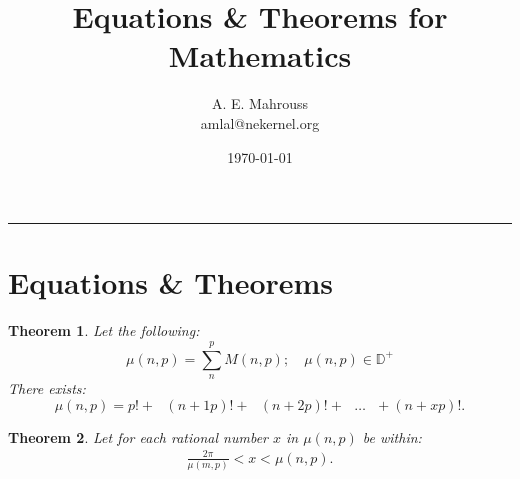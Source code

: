 \documentclass[10pt]{article}
\title{%
  \vspace{-1.5em}%
  \large\textbf{Equations \& Theorems for Mathematics}%
}
\author{A. E. Mahrouss\\amlal@nekernel.org}
\date{\today}
\theoremstyle{plain}
\newtheorem{theorem}{Theorem}[section]
\theoremstyle{definition}
\theoremstyle{remark}
\begin{document}
  \maketitle
  \vspace{-0.5em}
  \vspace{0.8em}
  \rule{\linewidth}{0.4pt}
  \vspace{1em}


\section{Equations \& Theorems}

\begin{theorem}
	Let the following:
\begin{equation}
    \mu(n, p) = \sum_{n}^{p} M(n, p); \quad \mu(n, p) \in \mathbb{D}^{+}
\end{equation}
There exists:
\begin{equation}
    \mu(n, p) = p! + \text{ } (n+1p)! + \text{ } (n+2p)! + \text{ } \dots \text{ } + (n+xp)!.
\end{equation}
\end{theorem}

\begin{theorem}
	Let for each rational number $x$ in $\mu(n, p)$ be within:
	\begin{align*}
		\frac{2\pi}{\mu(m, p)} < x < \mu(n, p).\\
	\end{align*}
\end{theorem}

\nocite{*}



\end{document}
